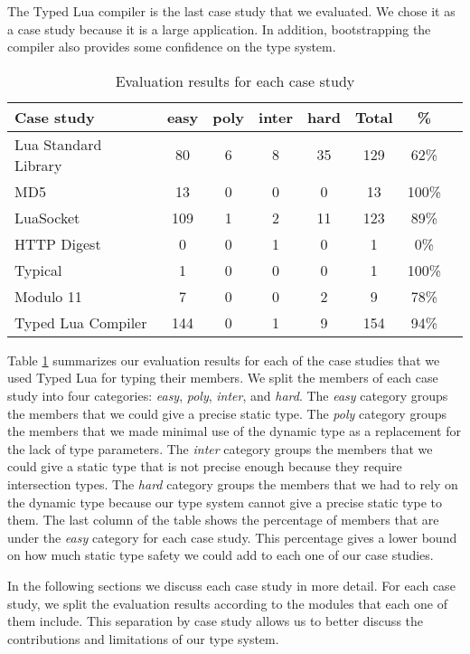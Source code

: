 The Typed Lua compiler is the last case study that we evaluated.
We chose it as a case study because it is a large application.
In addition, bootstrapping the compiler also provides some
confidence on the type system.

\begin{table}[!ht]
\begin{center}
\begin{tabular}{|l|c|c|c|c|c|c|c|}
\hline
\textbf{Case study} & \textbf{easy} & \textbf{poly} & \textbf{inter} & \textbf{hard} & \textbf{Total} & \textbf{\%} \\
\hline
Lua Standard Library & 80 & 6 & 8 & 35 & 129 & 62\% \\
\hline
MD5 & 13 & 0 & 0 & 0 & 13 & 100\% \\
\hline
LuaSocket & 109 & 1 & 2 & 11 & 123 & 89\% \\
\hline
HTTP Digest & 0 & 0 & 1 & 0 & 1 & 0\% \\
\hline
Typical & 1 & 0 & 0 & 0 & 1 & 100\% \\
\hline
Modulo 11 & 7 & 0 & 0 & 2 & 9 & 78\% \\
\hline
Typed Lua Compiler & 144 & 0 & 1 & 9 & 154 & 94\% \\
\hline
\end{tabular}
\end{center}
\caption{Evaluation results for each case study}
\label{tab:evalbycase}
\end{table}

Table \ref{tab:evalbycase} summarizes our evaluation results for each
of the case studies that we used Typed Lua for typing their members.
We split the members of each case study into four categories:
\emph{easy}, \emph{poly}, \emph{inter}, and \emph{hard}.
The \emph{easy} category groups the members that we could give
a precise static type.
The \emph{poly} category groups the members that we made minimal
use of the dynamic type as a replacement for the lack of type parameters.
The \emph{inter} category groups the members that we could give
a static type that is not precise enough because they require
intersection types.
The \emph{hard} category groups the members that we had to rely
on the dynamic type because our type system cannot give a precise
static type to them.
The last column of the table shows the percentage of members that
are under the \emph{easy} category for each case study.
This percentage gives a lower bound on how much static type safety
we could add to each one of our case studies.

In the following sections we discuss each case study in more detail.
For each case study, we split the evaluation results according
to the modules that each one of them include.
This separation by case study allows us to better discuss the
contributions and limitations of our type system.

